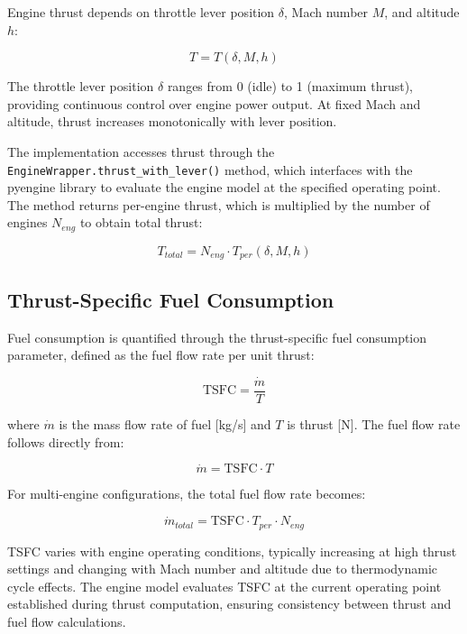 Engine thrust depends on throttle lever position $\delta$, Mach number $M$, and altitude $h$:

\begin{equation}
T = T(\delta, M, h)
\end{equation}

The throttle lever position $\delta$ ranges from 0 (idle) to 1 (maximum thrust), providing continuous control over engine power output. At fixed Mach and altitude, thrust increases monotonically with lever position.

The implementation accesses thrust through the \texttt{EngineWrapper.thrust\_with\_lever()} method, which interfaces with the pyengine library to evaluate the engine model at the specified operating point. The method returns per-engine thrust, which is multiplied by the number of engines $N_{eng}$ to obtain total thrust:

\begin{equation}
T_{total} = N_{eng} \cdot T_{per}(\delta, M, h)
\end{equation}

\subsection{Thrust-Specific Fuel Consumption}

Fuel consumption is quantified through the thrust-specific fuel consumption parameter, defined as the fuel flow rate per unit thrust:

\begin{equation}
\text{TSFC} = \frac{\dot{m}}{T}
\end{equation}

where $\dot{m}$ is the mass flow rate of fuel [kg/s] and $T$ is thrust [N]. The fuel flow rate follows directly from:

\begin{equation}
\dot{m} = \text{TSFC} \cdot T
\end{equation}

For multi-engine configurations, the total fuel flow rate becomes:

\begin{equation}
\dot{m}_{total} = \text{TSFC} \cdot T_{per} \cdot N_{eng}
\end{equation}

TSFC varies with engine operating conditions, typically increasing at high thrust settings and changing with Mach number and altitude due to thermodynamic cycle effects. The engine model evaluates TSFC at the current operating point established during thrust computation, ensuring consistency between thrust and fuel flow calculations.

